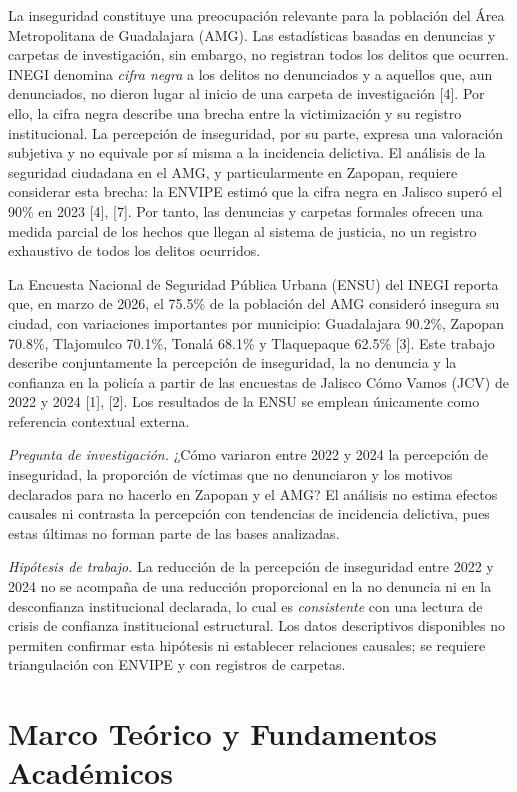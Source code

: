 \documentclass[10pt,twocolumn,letterpaper]{article}
\begin{document}
La inseguridad constituye una preocupación relevante para la población
del Área Metropolitana de Guadalajara (AMG). Las estadísticas basadas en
denuncias y carpetas de investigación, sin embargo, no registran todos
los delitos que ocurren. INEGI denomina \textit{cifra negra} a los delitos
no denunciados y a aquellos que, aun denunciados, no dieron lugar al
inicio de una carpeta de investigación [4]. Por ello, la cifra negra
describe una brecha entre la victimización y su registro institucional.
La percepción de inseguridad, por su parte, expresa una valoración
subjetiva y no equivale por sí misma a la incidencia delictiva.
El análisis de la seguridad ciudadana en el AMG, y particularmente en
Zapopan, requiere considerar esta brecha: la ENVIPE estimó que la cifra
negra en Jalisco superó el 90\% en 2023 [4], [7]. Por tanto, las
denuncias y carpetas formales ofrecen una medida parcial de los hechos
que llegan al sistema de justicia, no un registro exhaustivo de todos
los delitos ocurridos.

La Encuesta Nacional de Seguridad Pública Urbana (ENSU) del INEGI
reporta que, en marzo de 2026, el 75.5\% de la población del AMG
consideró insegura su ciudad, con variaciones importantes por municipio:
Guadalajara 90.2\%, Zapopan 70.8\%, Tlajomulco 70.1\%, Tonalá 68.1\% y
Tlaquepaque 62.5\% [3]. Este trabajo describe conjuntamente la percepción de inseguridad, la no
denuncia y la confianza en la policía a partir de las encuestas de
Jalisco Cómo Vamos (JCV) de 2022 y 2024 [1], [2]. Los resultados de la
ENSU se emplean únicamente como referencia contextual externa.

\textit{Pregunta de investigación.} ¿Cómo variaron entre 2022 y 2024 la
percepción de inseguridad, la proporción de víctimas que no denunciaron y
los motivos declarados para no hacerlo en Zapopan y el AMG? El análisis
no estima efectos causales ni contrasta la percepción con tendencias de
incidencia delictiva, pues estas últimas no forman parte de las bases
analizadas.

\textit{Hipótesis de trabajo.} La reducción de la percepción de
inseguridad entre 2022 y 2024 no se acompaña de una reducción
proporcional en la no denuncia ni en la desconfianza institucional
declarada, lo cual es \textit{consistente} con una lectura de crisis de
confianza institucional estructural. Los datos descriptivos disponibles
no permiten confirmar esta hipótesis ni establecer relaciones causales;
se requiere triangulación con ENVIPE y con registros de carpetas.

\section{Marco Teórico y Fundamentos Académicos}
\end{document}
